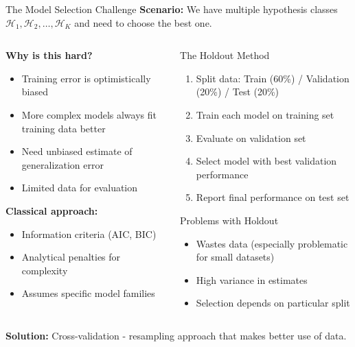 \documentclass[aspectratio=169,11pt]{beamer}
\begin{document}
\begin{frame}{The Model Selection Challenge}
\textbf{Scenario:} We have multiple hypothesis classes $\mathcal{H}_1, \mathcal{H}_2, \ldots, \mathcal{H}_K$ and need to choose the best one.

\begin{columns}
\begin{column}{0.5\textwidth}
\textbf{Why is this hard?}
\begin{itemize}
\item Training error is optimistically biased
\item More complex models always fit training data better
\item Need unbiased estimate of generalization error
\item Limited data for evaluation
\end{itemize}

\vspace{0.3cm}
\textbf{Classical approach:}
\begin{itemize}
\item Information criteria (AIC, BIC)
\item Analytical penalties for complexity
\item Assumes specific model families
\end{itemize}
\end{column}
\begin{column}{0.5\textwidth}
\begin{block}{The Holdout Method}
\begin{enumerate}
\item Split data: Train (60\%) / Validation (20\%) / Test (20\%)
\item Train each model on training set
\item Evaluate on validation set
\item Select model with best validation performance
\item Report final performance on test set
\end{enumerate}
\end{block}

\begin{alertblock}{Problems with Holdout}
\begin{itemize}
\item Wastes data (especially problematic for small datasets)
\item High variance in estimates
\item Selection depends on particular split
\end{itemize}
\end{alertblock}
\end{column}
\end{columns}

\vspace{0.3cm}
\textbf{Solution:} Cross-validation - resampling approach that makes better use of data.
\end{frame}
\end{document}
